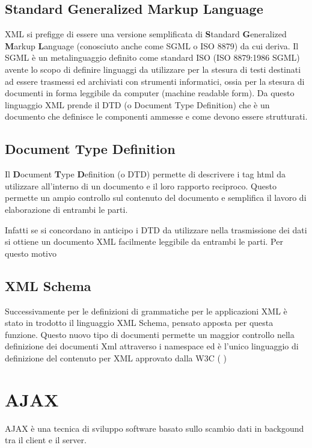 \documentclass{report}
\begin{document}
\section{Standard Generalized Markup Language}
XML si prefigge di essere una versione semplificata di \textbf{S}tandard \textbf{G}eneralized \textbf{M}arkup \textbf{L}anguage (conosciuto anche come SGML o ISO 8879) da cui deriva.
Il SGML è un metalinguaggio definito come standard ISO (ISO 8879:1986 SGML) avente lo scopo di definire linguaggi da utilizzare per la stesura di testi destinati ad essere trasmessi ed archiviati con strumenti informatici, ossia per la stesura di documenti in forma leggibile da computer (machine readable form). Da questo linguaggio XML prende il DTD (o Document Type Definition) che è un documento che definisce le componenti ammesse e come devono essere strutturati.

\section{Document Type Definition}
Il \textbf{D}ocument \textbf{T}ype \textbf{D}efinition (o DTD) permette di descrivere i tag html da utilizzare all'interno di un documento e il loro rapporto reciproco. Questo permette un ampio controllo sul contenuto del documento e semplifica il lavoro di elaborazione di entrambi le parti. 

Infatti se si concordano in anticipo i DTD da utilizzare nella trasmissione dei dati si ottiene un documento XML facilmente leggibile da entrambi le parti. Per questo motivo 

\section{XML Schema}
Successivamente per le definizioni di grammatiche per le applicazioni XML è stato in trodotto il linguaggio XML Schema, pensato apposta per questa funzione. Questo nuovo tipo di documenti permette un maggior controllo nella definizione dei documenti Xml attraverso i namespace ed è l'unico linguaggio di definizione del contenuto per XML approvato dalla W3C (\cite{site:w3cxmlschame} )


\chapter{AJAX}
AJAX è una tecnica di sviluppo software basato sullo scambio dati in backgound tra il client e il server. 

\nocite{w3c}
\printbibliography
\end{document}
